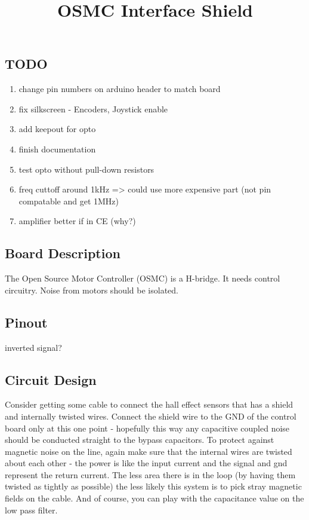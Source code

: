 \documentclass[letterpaper,12pt,notitlepage]{report}
\begin{document}
\title{OSMC Interface Shield}
\author{}
\date{}
\maketitle

\subsection{TODO}
\begin{enumerate}
 \item change pin numbers on arduino header to match board
 \item fix silkscreen -  Encoders, Joystick enable
 \item add keepout for opto
 \item finish documentation
 \item test opto without pull-down resistors
 \item freq cuttoff around 1kHz => could use more expensive part (not pin compatable and get 1MHz)
 \item amplifier better if in CE (why?)
\end{enumerate}

\subsection{Board Description}
The Open Source Motor Controller (OSMC) is a H-bridge.  It needs control circuitry.  Noise from motors should be isolated.


\subsection{Pinout}

inverted signal?

\subsection{Circuit Design}

Consider getting some cable to connect the hall effect sensors that has a shield and internally twisted wires. Connect the shield wire to the GND of the control board only at this one point - hopefully this way any capacitive coupled noise should be conducted straight to the bypass capacitors. To protect against magnetic noise on the line, again make sure that the internal wires are twisted about each other - the power is like the input current and the signal and gnd represent the return current. The less area there is in the loop (by having them twisted as tightly as possible) the less likely this system is to pick stray magnetic fields on the cable. And of course, you can play with the capacitance value on the low pass filter. 
\end{document}
